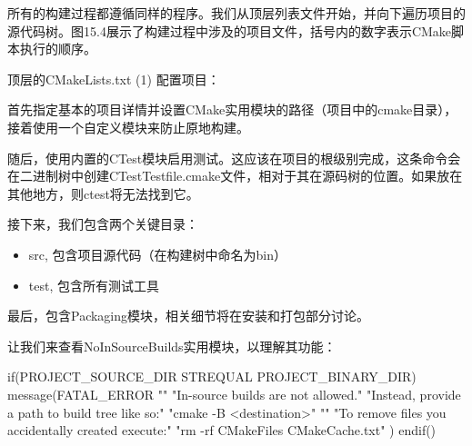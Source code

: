 
所有的构建过程都遵循同样的程序。我们从顶层列表文件开始，并向下遍历项目的源代码树。图15.4展示了构建过程中涉及的项目文件，括号内的数字表示CMake脚本执行的顺序。


顶层的CMakeLists.txt (1) 配置项目：



首先指定基本的项目详情并设置CMake实用模块的路径（项目中的cmake目录），接着使用一个自定义模块来防止原地构建。

随后，使用内置的CTest模块启用测试。这应该在项目的根级别完成，这条命令会在二进制树中创建CTestTestfile.cmake文件，相对于其在源码树的位置。如果放在其他地方，则ctest将无法找到它。

接下来，我们包含两个关键目录：

\begin{itemize}
\item
src, 包含项目源代码（在构建树中命名为bin）

\item
test, 包含所有测试工具
\end{itemize}

最后，包含Packaging模块，相关细节将在安装和打包部分讨论。

让我们来查看NoInSourceBuilds实用模块，以理解其功能：


\begin{cmake}
if(PROJECT_SOURCE_DIR STREQUAL PROJECT_BINARY_DIR)
    message(FATAL_ERROR
        "\n"
        "In-source builds are not allowed.\n"
        "Instead, provide a path to build tree like so:\n"
        "cmake -B <destination>\n"
        "\n"
        "To remove files you accidentally created execute:\n"
        "rm -rf CMakeFiles CMakeCache.txt\n"
    )
endif()
\end{cmake}

